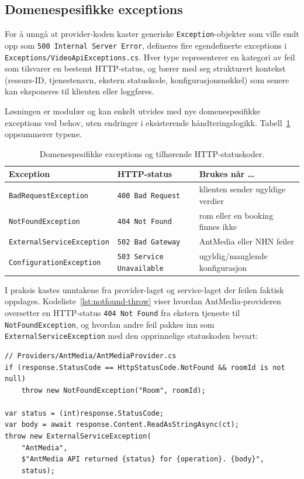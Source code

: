 \subsection{Domenespesifikke exceptions}
\label{subsec:errors-exceptions}

For å unngå at provider-koden kaster generiske \texttt{Exception}-objekter som ville endt opp som \texttt{500 Internal Server Error}, defineres fire egendefinerte exceptions i \texttt{Exceptions/VideoApiExceptions.cs}. Hver type representerer en kategori av feil som tilsvarer en bestemt HTTP-status, og bærer med seg strukturert kontekst (ressurs-ID, tjenestenavn, ekstern statuskode, konfigurasjonsnøkkel) som senere kan eksponeres til klienten eller loggføres.

Løsningen er modulær og kan enkelt utvides med nye domenespesifikke exceptions ved behov, uten endringer i eksisterende håndteringslogikk. Tabell~\ref{tab:domain-exceptions} oppsummerer typene.

\begin{table}[htbp]
\centering
\caption{Domenespesifikke exceptions og tilhørende HTTP-statuskoder.}
\label{tab:domain-exceptions}
\begin{tabular}{l l l}
\toprule
\textbf{Exception} & \textbf{HTTP-status} & \textbf{Brukes når \dots} \\
\midrule
\texttt{BadRequestException}      & \texttt{400 Bad Request}          & klienten sender ugyldige verdier \\
\texttt{NotFoundException}        & \texttt{404 Not Found}            & rom eller en booking finnes ikke \\
\texttt{ExternalServiceException} & \texttt{502 Bad Gateway}          & AntMedia eller NHN feiler \\
\texttt{ConfigurationException}   & \texttt{503 Service Unavailable}  & ugyldig/manglende konfigurasjon \\
\bottomrule
\end{tabular}
\end{table}

\newpage
I praksis kastes unntakene fra provider-laget og service-laget der feilen faktisk oppdages. Kodeliste~\ref{lst:notfound-throw} viser hvordan AntMedia-provideren oversetter en HTTP-status \texttt{404 Not Found} fra ekstern tjeneste til \texttt{NotFoundException}, og hvordan andre feil pakkes inn som \texttt{ExternalServiceException} med den opprinnelige statuskoden bevart:

\begin{lstlisting}[language={[Sharp]C}, caption={Kasting av domeneeksepsjon i AntMediaProvider.}, label={lst:notfound-throw}]
// Providers/AntMedia/AntMediaProvider.cs
if (response.StatusCode == HttpStatusCode.NotFound && roomId is not null)
    throw new NotFoundException("Room", roomId);

var status = (int)response.StatusCode;
var body = await response.Content.ReadAsStringAsync(ct);
throw new ExternalServiceException(
    "AntMedia",
    $"AntMedia API returned {status} for {operation}. {body}",
    status);
\end{lstlisting}

